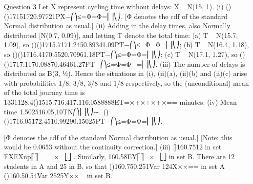 Question 3
Let X represent cycling time without delays: X ~ N(15, 1).
(i) ()()17151720.97721PX−⎛⎞≤=Φ=Φ=⎜⎟⎝⎠.
[Φ denotes the cdf of the standard Normal distribution as usual.]
(ii) Adding in the delay times, also Normally distributed [N(0.7, 0.09)], and letting T denote the total time:
(a) T ~ N(15.7, 1.09), so ()()1715.7171.2450.89341.09PT−⎛⎞≤=Φ=Φ=⎜⎟⎝⎠;
(b) T ~ N(16.4, 1.18), so ()()1716.4170.5520.70961.18PT−⎛⎞≤=Φ=Φ=⎜⎟⎝⎠;
(c) T ~ N(17.1, 1.27), so ()()1717.1170.08870.46461.27PT−⎛⎞≤=Φ=Φ−=⎜⎟⎝⎠.
(iii) The number of delays is distributed as B(3, ½). Hence the situations in (i), (ii)(a), (ii)(b) and (ii)(c) arise with probabilities 1/8, 3/8, 3/8 and 1/8 respectively, so the (unconditional) mean of the total journey time is 1331128.4()1515.716.417.116.0588888ET=×+×+×+×== minutes.
(iv) Mean time 1.502516.05,10TN⎛⎞⎜⎟⎝⎠∼. ()()1716.05172.4510.99290.15025PT−⎛⎞≤=Φ=Φ=⎜⎟⎝⎠.

[Φ denotes the cdf of the standard Normal distribution as usual.]
[Note: this would be 0.0653 without the continuity correction.]
(iii) []160.7512 in set EXEXnp⎡⎤===×=⎣⎦ .
Similarly, 160.58EY⎡⎤=×=⎣⎦ in set B.
There are 12 students in A and 25 in B, so that ()160.750.251Var 124X××== in set A ()160.50.54Var 2525Y××= in set B.